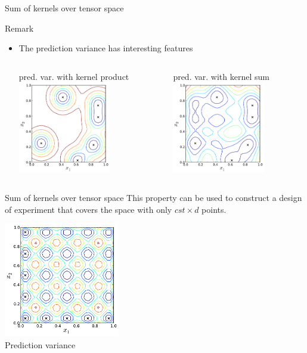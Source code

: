 \begin{frame}{Sum of kernels over tensor space}
\begin{block}{Remark}%
\begin{itemize}
\item The prediction variance has interesting features
\begin{columns}[c]
\begin{column}{5cm}
\begin{center}
pred. var. with kernel product
\includegraphics[height=4cm]{3_gaussian_process_regression/figures/python/kernelmodels-predvarprod}
\end{center}
\end{column}
\begin{column}{5cm}
\begin{center}
pred. var. with kernel sum
\includegraphics[height=4cm]{3_gaussian_process_regression/figures/python/kernelmodels-predvar}
\end{center}
\end{column}
\end{columns}
\end{itemize}
\end{block}
\end{frame}

\begin{frame}{Sum of kernels over tensor space}
This property can be used to construct a design of experiment that covers the space with only $cst \times d$ points.
\begin{center}
\includegraphics[height=5cm]{3_gaussian_process_regression/figures/python/kernelmodels-predaxe}\\
Prediction variance
\end{center}
\vfill
\end{frame}

